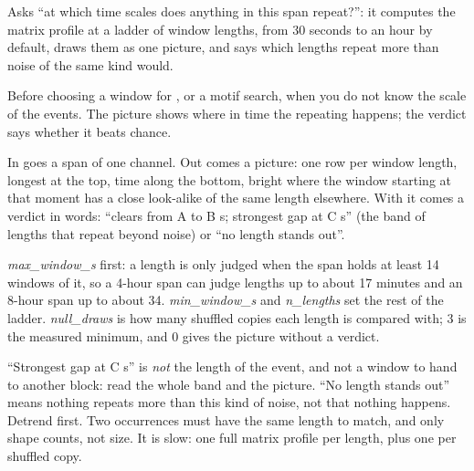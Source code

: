 Asks ``at which time scales does anything in this span repeat?'': it computes the matrix profile
at a ladder of window lengths, from 30 seconds to an hour by default, draws them as one picture,
and says which lengths repeat more than noise of the same kind would.

Before choosing a window for ,  or a
motif search, when you do not know the scale of the events. The picture shows where in time the
repeating happens; the verdict says whether it beats chance.

In goes a span of one channel. Out comes a picture: one row per window length, longest at the top,
time along the bottom, bright where the window starting at that moment has a close look-alike of
the same length elsewhere. With it comes a verdict in words: ``clears from A to B s; strongest gap at
C s'' (the band of lengths that repeat beyond noise) or ``no length stands out''.

\emph{max\_window\_s} first: a length is only judged when the span holds at least 14 windows of
it, so a 4-hour span can judge lengths up to about 17 minutes and an 8-hour span up to about 34.
\emph{min\_window\_s} and \emph{n\_lengths} set the rest of the ladder. \emph{null\_draws} is how
many shuffled copies each length is compared with; 3 is the measured minimum, and 0 gives the
picture without a verdict.

``Strongest gap at C s'' is \emph{not} the length of the event, and not a window to hand to another
block: read the whole band and the picture. ``No length stands out'' means nothing repeats more than
this kind of noise, not that nothing happens. Detrend first. Two occurrences must have the same
length to match, and only shape counts, not size. It is slow: one full matrix profile per length,
plus one per shuffled copy.

